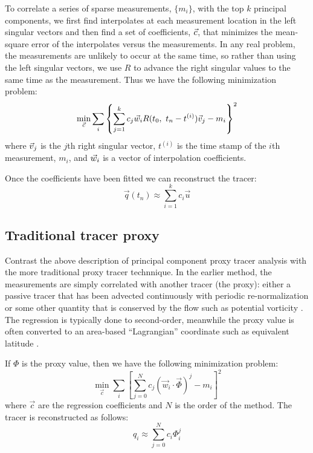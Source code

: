 \documentclass{article}
\begin{document}
To correlate a series of sparse measurements, $\lbrace m_i \rbrace$,
with the top $k$ principal components, we first find interpolates at each
measurement location in the left singular vectors and then find a set
of coefficients, $\vec c$, that minimizes the mean-square error of the
interpolates versus the measurements.
In any real problem, the measurements are unlikely to occur at the same time,
so rather than using the left singular vectors, we use $R$ to advance the
right singular values to the same time as the measurement. 
Thus we have the following minimization problem:
\begin{equation}
	\min_{\vec c} \sum_i \left \lbrace \sum_{j=1}^k c_j \vec w_i R(t_0, ~ t_n-t^{(i)}) \vec v_j - m_i \right \rbrace^2
\end{equation}
where $\vec v_j$ is the $j$th right singular vector, $t^{(i)}$ is the time
stamp of the $i$th measurement, $m_i$, and $\vec w_i$ is a vector of 
interpolation coefficients.

Once the coefficients have been fitted we can reconstruct the tracer:
\begin{equation}
	\vec q(t_n) \approx \sum_{i=1}^k c_i \vec u
\end{equation}

\subsection{Traditional tracer proxy}

Contrast the above description of principal component proxy tracer
analysis with the more traditional proxy tracer technnique.
In the earlier method, the measurements are simply correlated with another
tracer (the proxy): either a passive tracer that has been advected
continuously with periodic re-normalization \citep{Allen_Nakamura2003} 
or some other quantity that is conserved by the flow 
such as potential vorticity \citep{Randall_etal2002,Hoskins_etal1985}.
The regression is typically done to second-order, meanwhile the proxy value
is often converted to an area-based ``Lagrangian'' coordinate such as
equivalent latitude \citep{Butchart_Remsberg1986}.

If $\Phi$ is the proxy value, then we have the following minimization
problem:
\begin{equation}
	\min_{\vec c} \sum_i \left [ \sum_{j=0}^N c_j (\vec w_i \cdot \vec \Phi)^j - m_i \right ]^2
\end{equation}
where $\vec c$ are the regression coefficients and $N$ is the order of the
method. The tracer is reconstructed as follows:
\begin{equation}
	q_i \approx \sum_{j=0}^N c_i \Phi_i^j
\end{equation}
\end{document}

